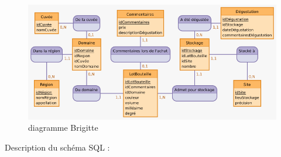 \documentclass[11pt]{article}
\makeatletter
\def\maxwidth{\ifdim\Gin@nat@width>\linewidth\linewidth
    \else\Gin@nat@width\fi}
\let\Oldincludegraphics\includegraphics
\renewcommand{\includegraphics}[1]{\Oldincludegraphics[width=.8\maxwidth]{#1}}
\makeatother
\begin{document}
    \begin{figure}
\centering
\includegraphics{Brigitte/Tp2_CaveVin/Tp2_CaveVin.png}
\caption{diagramme Brigitte}
\end{figure}

Description du schéma SQL :
\end{document}
